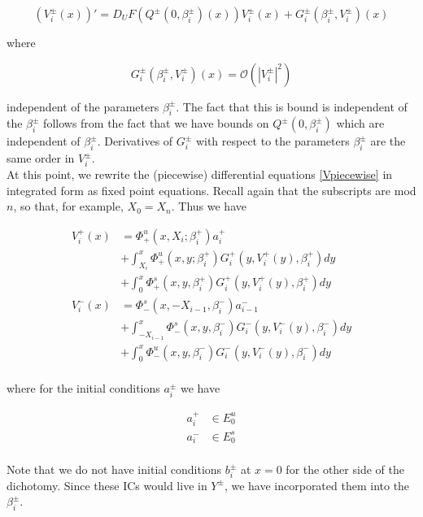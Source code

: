 \documentclass[12pt]{article}
\begin{document}
\begin{equation}\label{Vpiecewise}
(V_i^\pm(x))' = D_U F(Q^\pm(0, \beta_i^\pm)(x)) V_i^\pm(x)  + G_i^\pm(\beta_i^\pm, V_i^\pm)(x)
\end{equation}

where 

\begin{equation}\label{Gquadratic}
G_i^\pm(\beta_i^\pm, V_i^\pm)(x) = \mathcal{O}(|V_i^\pm|^2)
\end{equation}

independent of the parameters $\beta_i^\pm$. The fact that this is bound is independent of the $\beta_i^\pm$ follows from the fact that we have bounds on $Q^\pm(0, \beta_i^\pm)$ which are independent of $\beta_i^\pm$. Derivatives of $G_i^\pm$ with respect to the parameters $\beta_i^\pm$ are the same order in $V_i^\pm$.\\

At this point, we rewrite the (piecewise) differential equations \eqref{Vpiecewise} in integrated form as fixed point equations. Recall again that the subscripts are mod $n$, so that, for example, $X_0 = X_n$. Thus we have

\begin{align*}
V_i^+(x) &= \Phi^u_+(x, X_i; \beta_i^+) a_i^+  \\
&+ \int_{X_i}^x \Phi_+^u(x, y; \beta_i^+) G_i^+(y, V_i^+(y),\beta_i^+)dy \\
&+ \int_0^x \Phi_+^s(x, y, \beta_i^+) G_i^+(y, V_i^+(y),\beta_i^+)dy \\ 
V_i^-(x) &= \Phi^s_-(x, -X_{i-1}, \beta_i^-) a_{i-1}^-  \\
&+ \int_{-X_{i-1}}^x \Phi_-^s(x, y, \beta_i^-) G_i^-(y, V_i^-(y),\beta_i^-)dy \\
&+ \int_0^x \Phi_-^u(x, y, \beta_i^-) G_i^-(y, V_i^-(y),\beta_i^-)dy \\
\end{align*}

where for the initial conditions $a_i^\pm$ we have

\begin{align*}
a_i^+ &\in E_0^u \\
a_i^- &\in E_0^s \\
\end{align*}

Note that we do not have initial conditions $b_i^\pm$ at $x = 0$ for the other side of the dichotomy. Since these ICs would live in $Y^\pm$, we have incorporated them into the $\beta_i^\pm$.\\
\end{document}

